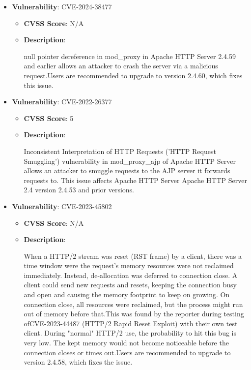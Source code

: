 \documentclass{article}
\begin{document}
\begin{itemize}
        \item \textbf{Vulnerability}: CVE-2024-38477
        \begin{itemize}
            \item \textbf{CVSS Score}:  N/A 
            \item \textbf{Description}:
            \parbox[t]{0.9\linewidth}{
                \ttfamily null pointer dereference in mod\_proxy in Apache HTTP Server 2.4.59 and earlier allows an attacker to crash the server via a malicious request.Users are recommended to upgrade to version 2.4.60, which fixes this issue.
            }
        \end{itemize}
    
        \item \textbf{Vulnerability}: CVE-2022-26377
        \begin{itemize}
            \item \textbf{CVSS Score}:  5 
            \item \textbf{Description}:
            \parbox[t]{0.9\linewidth}{
                \ttfamily Inconsistent Interpretation of HTTP Requests ('HTTP Request Smuggling') vulnerability in mod\_proxy\_ajp of Apache HTTP Server allows an attacker to smuggle requests to the AJP server it forwards requests to. This issue affects Apache HTTP Server Apache HTTP Server 2.4 version 2.4.53 and prior versions.
            }
        \end{itemize}
    
        \item \textbf{Vulnerability}: CVE-2023-45802
        \begin{itemize}
            \item \textbf{CVSS Score}:  N/A 
            \item \textbf{Description}:
            \parbox[t]{0.9\linewidth}{
                \ttfamily When a HTTP/2 stream was reset (RST frame) by a client, there was a time window were the request's memory resources were not reclaimed immediately. Instead, de-allocation was deferred to connection close. A client could send new requests and resets, keeping the connection busy and open and causing the memory footprint to keep on growing. On connection close, all resources were reclaimed, but the process might run out of memory before that.This was found by the reporter during testing ofCVE-2023-44487 (HTTP/2 Rapid Reset Exploit) with their own test client. During "normal" HTTP/2 use, the probability to hit this bug is very low. The kept memory would not become noticeable before the connection closes or times out.Users are recommended to upgrade to version 2.4.58, which fixes the issue.
            }
        \end{itemize}
    

\end{itemize}
\end{document}
